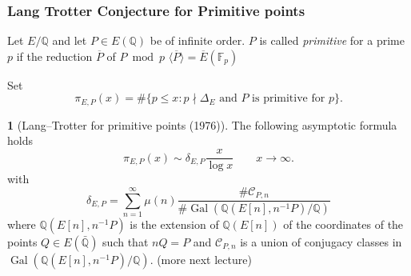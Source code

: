 \documentclass[10pt,final]{beamer} %
\newcommand{\Q}{\mathbb Q}
\newcommand{\F}{\mathbb F}
\theoremstyle{definition}
\newtheorem{conj}[theorem]{\translate{Conjecture}}
\begin{document}
\begin{frame}
\frametitle{Lang Trotter Conjecture for Primitive points} \pause

\begin{definition}
   Let $E/\Q$ and let $P\in E(\Q)$ be of infinite order. 
   $P$ is called \emph{primitive} for a prime $p$ if the reduction $\overline P$ of $P\bmod p$ 
    $\langle \overline P\rangle =\overline E(\F_p)$
\end{definition}\pause

Set $$\pi_{E,P}(x)=\#\{p\le x: p\nmid\Delta_E\text{ and } P\text{ is primitive for } p\}.$$\pause

\begin{conj}[Lang--Trotter for primitive points (1976)] The following asymptotic formula holds
$$\pi_{E,P}(x)\sim \delta_{E,P}\frac x{\log x}\qquad x\rightarrow\infty.$$
with\vspace*{-4pt}\pause
$$\delta_{E,P}=\sum_{n=1}^\infty\mu(n)\frac{\#\mathcal C_{P,n}}{\#\operatorname{Gal}(\Q(E[n],n^{-1}P)/\Q)}$$
where $\Q(E[n],n^{-1}P)$ is the extension of $\Q(E[n])$ of the coordinates of the points
$Q\in E(\bar{\Q})$ such that $nQ=P$ and $\mathcal C_{P,n}$ is a union of conjugacy classes in 
$\operatorname{Gal}(\Q(E[n],n^{-1}P)/\Q)$. (more next lecture)
\end{conj}
\end{frame}
\end{document}
